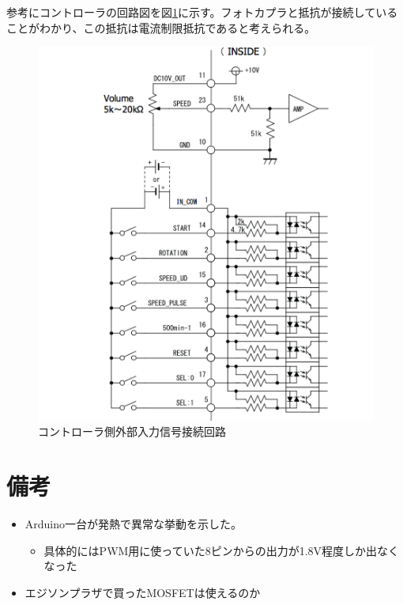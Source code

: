 \documentclass[]{jsarticle}
\begin{document}
参考にコントローラの回路図を図\ref{input}に示す。フォトカプラと抵抗が接続していることがわかり、この抵抗は電流制限抵抗であると考えられる。
\begin{figure}[htbp]
\centering
\includegraphics[width=130mm]{./image/minitor_input.pdf}
\caption{コントローラ側外部入力信号接続回路}
\label{input}
\end{figure}



%
%




\section{備考}
\begin{itemize}
\item Arduino一台が発熱で異常な挙動を示した。
 \begin{itemize}
   \item 具体的にはPWM用に使っていた8ピンからの出力が1.8V程度しか出なくなった
 \end{itemize}
\item エジソンプラザで買ったMOSFETは使えるのか
\end{itemize}
\end{document}

